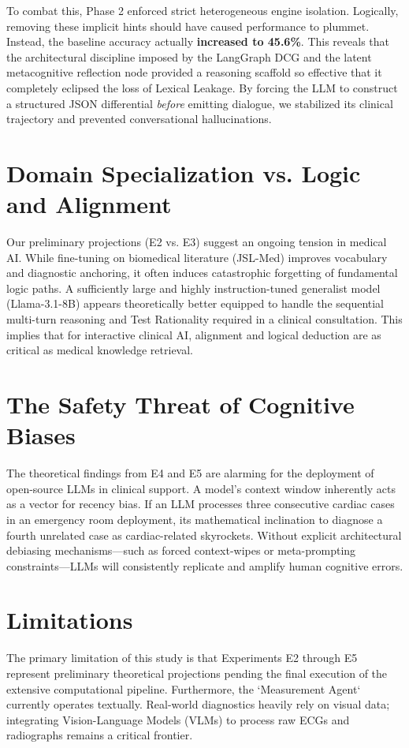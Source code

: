 \documentclass[12pt, a4paper, twoside]{report}
\begin{document}
To combat this, Phase 2 enforced strict heterogeneous engine isolation. Logically, removing these implicit hints should have caused performance to plummet. Instead, the baseline accuracy actually \textbf{increased to 45.6\%}. This reveals that the architectural discipline imposed by the LangGraph DCG and the latent metacognitive reflection node provided a reasoning scaffold so effective that it completely eclipsed the loss of Lexical Leakage. By forcing the LLM to construct a structured JSON differential \textit{before} emitting dialogue, we stabilized its clinical trajectory and prevented conversational hallucinations.

\section{Domain Specialization vs. Logic and Alignment}
Our preliminary projections (E2 vs. E3) suggest an ongoing tension in medical AI. While fine-tuning on biomedical literature (JSL-Med) improves vocabulary and diagnostic anchoring, it often induces catastrophic forgetting of fundamental logic paths. A sufficiently large and highly instruction-tuned generalist model (Llama-3.1-8B) appears theoretically better equipped to handle the sequential multi-turn reasoning and Test Rationality required in a clinical consultation. This implies that for interactive clinical AI, alignment and logical deduction are as critical as medical knowledge retrieval.

\section{The Safety Threat of Cognitive Biases}
The theoretical findings from E4 and E5 are alarming for the deployment of open-source LLMs in clinical support. A model's context window inherently acts as a vector for recency bias. If an LLM processes three consecutive cardiac cases in an emergency room deployment, its mathematical inclination to diagnose a fourth unrelated case as cardiac-related skyrockets. Without explicit architectural debiasing mechanisms—such as forced context-wipes or meta-prompting constraints—LLMs will consistently replicate and amplify human cognitive errors.

\section{Limitations}
The primary limitation of this study is that Experiments E2 through E5 represent preliminary theoretical projections pending the final execution of the extensive computational pipeline. Furthermore, the `Measurement Agent` currently operates textually. Real-world diagnostics heavily rely on visual data; integrating Vision-Language Models (VLMs) to process raw ECGs and radiographs remains a critical frontier.
\end{document}
